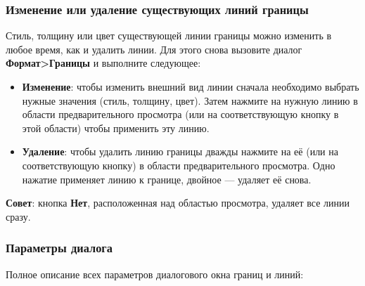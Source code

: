 ﻿\documentclass[a4paper,10pt]{article}
\begin{document}
\subsubsection{Изменение или удаление существующих линий границы}
Стиль, толщину или цвет существующей линии границы можно изменить в любое время, как и удалить линии. Для этого снова вызовите диалог \textbf{Формат>Границы} и выполните следующее:
\begin{itemize}
 \item \textbf{Изменение}: чтобы изменить внешний вид линии сначала необходимо выбрать нужные значения (стиль, толщину, цвет). Затем нажмите на нужную линию в области предварительного просмотра (или на соответствующую кнопку в этой области) чтобы применить эту линию.
 \item \textbf{Удаление}: чтобы удалить линию границы дважды нажмите на её (или на соответствующую кнопку) в области предварительного просмотра. Одно нажатие применяет линию к границе, двойное — удаляет её снова.
\end{itemize}

\textbf{Совет}: кнопка \textbf{Нет}, расположенная над областью просмотра, удаляет все линии сразу.

\subsubsection{Параметры диалога}
Полное описание всех параметров диалогового окна границ и линий:
\end{document}
